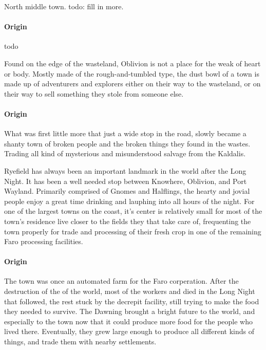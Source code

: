 \documentclass[letterpaper,twocolumn,openany,nodeprecatedcode]{dndbook}
\begin{document}

North middle town. todo: fill in more.

\paragraph{Origin}
todo


Found on the edge of the wasteland, Oblivion is not a place for the weak of heart or body.
Mostly made of the rough-and-tumbled type, the dust bowl of a town is made up of adventurers
and explorers either on their way to the wasteland, or on their way to sell something they
stole from someone else.

\paragraph{Origin}
What was first little more that just a wide stop in the road, slowly became a shanty town
of broken people and the broken things they found in the wastes. Trading all kind of mysterious
and misunderstood salvage from the Kaldalis.


Ryefield has always been an important landmark in the world after the Long Night. It has been a
well needed stop between Knowhere, Oblivion, and Port Wayland.  Primarily comprised of
Gnomes and Halflings, the hearty and jovial people enjoy a great time drinking and lauphing
into all hours of the night. For one of the largest towns on the coast, it's center is
relatively small for most of the town's residence live closer to the fields they that take
care of, frequenting the town properly for trade and processing of their fresh crop in one
of the remaining Faro processing facilities.

\paragraph{Origin}
The town was once an automated farm for the Faro corperation. After the destruction of the
of the world, most of the workers and died in the Long Night that followed, the rest stuck
by the decrepit facility, still trying to make the food they needed to survive. The Dawning
brought a bright future to the world, and especially to the town now that it could produce
more food for the people who lived there. Eventually, they grew large enough to produce all
different kinds of things, and trade them with nearby settlements.
\end{document}

